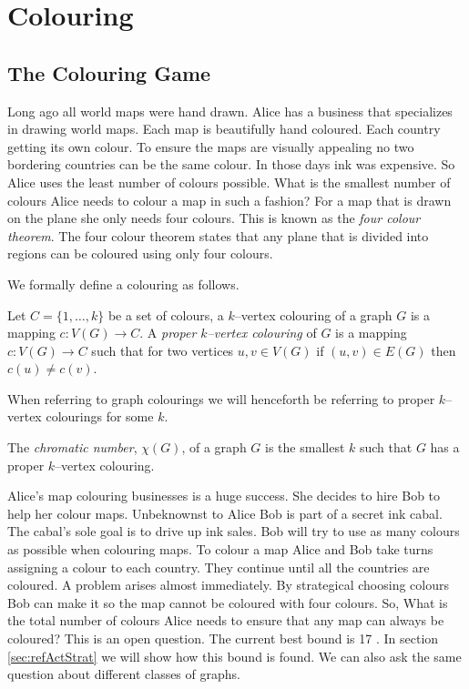 \chapter{Colouring}\label{chpt:colouring}

\section{The Colouring Game}

Long ago all world maps were hand drawn. Alice has a business that specializes in drawing world maps. Each map is beautifully hand coloured. Each country getting its own colour. To ensure the maps are visually appealing no two bordering countries can be the same colour. In those days ink was expensive. So Alice uses the least number of colours possible. What is the smallest number of colours Alice needs to colour a map in such a fashion? For a map that is drawn on the plane she only needs four colours. This is known as the \textit{four colour theorem}. The four colour theorem states that any plane that is divided into regions can be coloured using only four colours. 

We formally define a colouring as follows.
\begin{definition}
Let $C=\{1,\dots,k\}$ be a set of colours, a $k$--vertex colouring of a graph $G$ is a mapping $c\colon V(G) \to C$. A \textit{proper $k$--vertex colouring} of $G$ is a mapping $c\colon V(G) \to C$ such that for two vertices $u,v\in V(G)$ if $(u,v)\in E(G)$ then $c(u)\neq c(v)$. 
\end{definition}
When referring to graph colourings we will henceforth be referring to proper $k$--vertex colourings for some $k$. 
\begin{definition}
The \textit{chromatic number}, $\chi(G)$, of a graph $G$ is the smallest $k$ such that $G$ has a proper $k$--vertex colouring.
\end{definition} 

Alice's map colouring businesses is a huge success. She decides to hire Bob to help her colour maps. Unbeknownst to Alice Bob is part of a secret ink cabal. The cabal's sole goal is to drive up ink sales. Bob will try to use as many colours as possible when colouring maps. To colour a map Alice and Bob take turns assigning a colour to each country. They continue until all the countries are coloured. A problem arises almost immediately. By strategical choosing colours Bob can make it so the map cannot be coloured with four colours. So, What is the total number of colours Alice needs to ensure that any map can always be coloured? This is an open question. The current best bound is 17 \cite{Zhu2008}. In section \ref{sec:refActStrat} we will show how this bound is found. We can also ask the same question about different classes of graphs. 

